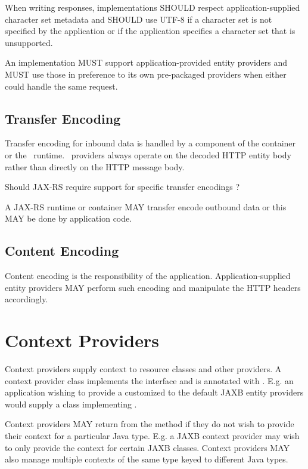 When writing responses, implementations SHOULD respect application-supplied character set metadata and SHOULD use UTF-8 if a character set is not specified by the application or if the application specifies a character set that is unsupported.

An implementation MUST support application-provided entity providers and MUST use those in preference to its own pre-packaged providers when either could handle the same request.

\subsection{Transfer Encoding}

Transfer encoding for inbound data is handled by a component of the container or the \jaxrs\ runtime. \MsgRead\ providers always operate on the decoded HTTP entity body rather than directly on the HTTP message body.

\begin{ednote}Should JAX-RS require support for specific transfer encodings ?\end{ednote}

A JAX-RS runtime or container MAY transfer encode outbound data or this MAY be done by application code.

\subsection{Content Encoding}

Content encoding is the responsibility of the application. Application-supplied entity providers MAY perform such encoding and manipulate the HTTP headers accordingly.

\section{Context Providers}
\label{contextprovider}

Context providers supply context to resource classes and other providers. A context provider class implements the  interface and is annotated with \Provider. E.g. an application wishing to provide a customized  to the default JAXB entity providers would supply a class implementing .

Context providers MAY return  from the  method if they do not wish to provide their context for a particular Java type. E.g. a JAXB context provider may wish to only provide the context for certain JAXB classes. Context providers MAY also manage multiple contexts of the same type keyed to different Java types.

